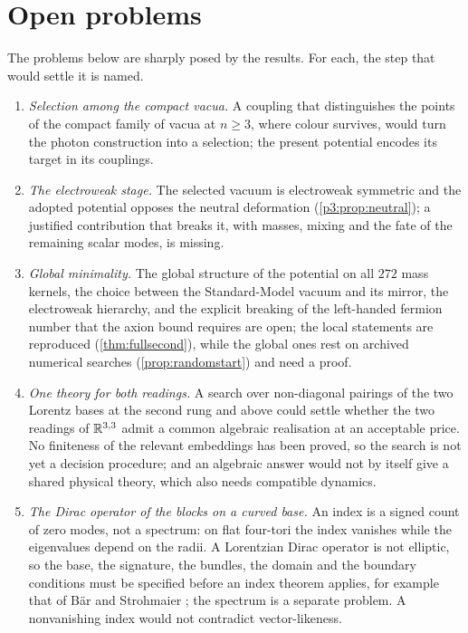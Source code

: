 \section{Open problems}
\label{sec:open}

The problems below are sharply posed by the results. For each, the step that would settle it is named.
\begin{enumerate}[label=(\arabic*),leftmargin=2.2em]
\item \emph{Selection among the compact vacua.} A coupling that distinguishes the points of the compact family of vacua at $n\ge3$, where colour
survives, would turn the photon construction into a selection; the present potential encodes its target in its couplings.
\item \emph{The electroweak stage.} The selected vacuum is electroweak symmetric and the adopted potential opposes the neutral deformation
(\cref{p3:prop:neutral}); a justified contribution that breaks it, with masses, mixing and the fate of the remaining scalar modes, is missing.
\item \emph{Global minimality.} The global structure of the potential on all $272$ mass kernels, the choice between the Standard-Model vacuum and
its mirror, the electroweak hierarchy, and the explicit breaking of the left-handed fermion number that the axion bound requires are open;
the local statements are reproduced (\cref{thm:fullsecond}), while the global ones rest on archived numerical searches (\cref{prop:randomstart}) and
need a proof.
\item \emph{One theory for both readings.} A search over non-diagonal pairings of the two Lorentz bases at the second rung and above could
settle whether the two readings of $\mathbb{R}^{3,3}$ admit a common algebraic realisation at an acceptable price. No finiteness of the relevant embeddings
has been proved, so the search is not yet a decision procedure; and an algebraic answer would not by itself give a shared physical theory,
which also needs compatible dynamics.
\item \emph{The Dirac operator of the blocks on a curved base.} An index is a signed count of zero modes, not a spectrum: on flat four-tori
the index vanishes while the eigenvalues depend on the radii. A Lorentzian Dirac operator is not elliptic, so the base, the signature, the
bundles, the domain and the boundary conditions must be specified before an index theorem applies, for example that of B\"ar and Strohmaier
\cite{BarStrohmaier19}; the spectrum is a separate problem. A nonvanishing index would not contradict vector-likeness.

\end{enumerate}

